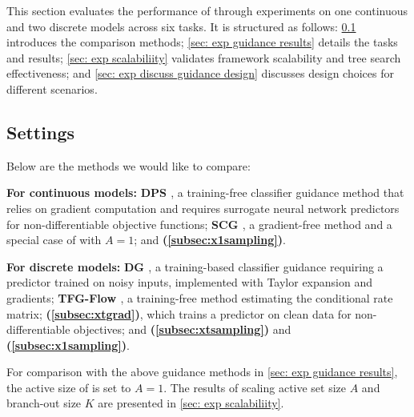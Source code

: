 This section evaluates the performance of \ouralg through experiments on one continuous and two discrete models across six tasks. It is structured as follows: \cref{sec: exp setting} introduces the comparison methods; \cref{sec: exp guidance results} details the tasks and results; \cref{sec: exp scalabiliity} validates framework scalability and tree search effectiveness; and \cref{sec: exp discuss guidance design} discusses design choices for different scenarios.



\subsection{Settings}\label{sec: exp setting}



Below are the methods we would like to compare:

\noindent \textbf{For continuous models:}  \textbf{DPS \citep{chung2022diffusion}}, a training-free classifier guidance method that relies on gradient computation and requires surrogate neural network predictors for non-differentiable objective functions; \textbf{SCG \citep{huang2024symbolic}}, a gradient-free method and a special case of \xtsampling with $A=1$; and \textbf{\xcleansampling (\cref{subsec:x1sampling})}.



\noindent \textbf{For discrete models:} \textbf{DG \citep{nisonoff2024unlocking}}, a training-based classifier guidance requiring a predictor trained on noisy inputs, implemented with Taylor expansion and gradients; \textbf{TFG-Flow \cite{lin2025tfgflow}}, a training-free method estimating the conditional rate matrix; \textbf{\xtgrad (\cref{subsec:xtgrad})}, which trains a predictor on clean data for non-differentiable objectives; and \textbf{\xtsampling (\cref{subsec:xtsampling})} and \textbf{\xcleansampling (\cref{subsec:x1sampling})}.



For comparison with the above guidance methods in \cref{sec: exp guidance results}, the active size of \ouralg is set to $A=1$. The results of scaling active set size $A$ and branch-out size $K$ are presented in \cref{sec: exp scalabiliity}. 
















